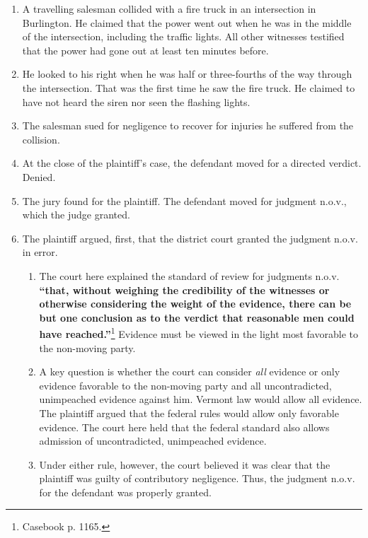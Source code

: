 \begin{enumerate}
    \item A travelling salesman collided with a fire truck in an intersection 
    in Burlington. He claimed that the power went out when he was in the 
    middle of the intersection, including the traffic lights. All other 
    witnesses testified that the power had gone out at least ten minutes 
    before.
    \item He looked to his right when he was half or three-fourths of the way 
    through the intersection. That was the first time he saw the fire truck. 
    He claimed to have not heard the siren nor seen the flashing lights.
    \item The salesman sued for negligence to recover for injuries he suffered 
    from the collision.
    \item At the close of the plaintiff's case, the defendant moved for a 
    directed verdict. Denied.
    \item The jury found for the plaintiff. The defendant moved for judgment 
    n.o.v., which the judge granted.
    \item The plaintiff argued, first, that the district court granted the 
    judgment n.o.v. in error.
    \begin{enumerate}
        \item The court here explained the standard of review for judgments 
        n.o.v. \textbf{``that, without weighing the credibility of the 
        witnesses or otherwise considering the weight of the evidence, there 
        can be but one conclusion as to the verdict that reasonable men could 
        have reached.''}\footnote{Casebook p. 1165.} Evidence must be viewed 
        in the light most favorable to the non-moving party.
        \item A key question is whether the court can consider \emph{all} 
        evidence or only evidence favorable to the non-moving party and all 
        uncontradicted, unimpeached evidence against him. Vermont law would 
        allow all evidence. The plaintiff argued that the federal rules would 
        allow only favorable evidence. The court here held that the federal 
        standard also allows admission of uncontradicted, unimpeached 
        evidence.
        \item Under either rule, however, the court believed it was clear that 
        the plaintiff was guilty of contributory negligence. Thus, the 
        judgment n.o.v. for the defendant was properly granted.
    \end{enumerate}

\end{enumerate}
